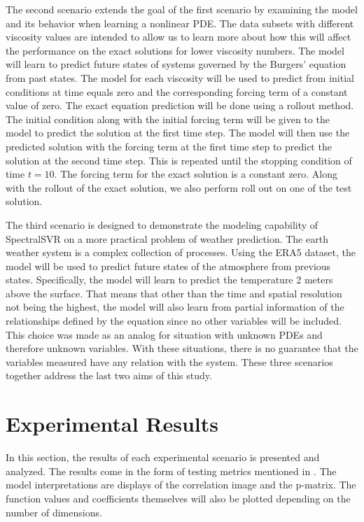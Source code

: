 The second scenario extends the goal of the first scenario by examining the model and its behavior when learning a nonlinear PDE\@. The data subsets with different viscosity values are intended to allow us to learn more about how this will affect the performance on the exact solutions for lower viscosity numbers. The model will learn to predict future states of systems governed by the Burgers' equation from past states. The model for each viscosity will be used to predict  from initial conditions at time equals zero and the corresponding forcing term of a constant value of zero. The exact equation prediction will be done using a rollout method. The initial condition along with the initial forcing term will be given to the model to predict the solution at the first time step. The model will then use the predicted solution with the forcing term at the first time step to predict the solution at the second time step. This is repeated until the stopping condition of time \(t=10\). The forcing term for the exact solution is a constant zero. Along with the rollout of the exact solution, we also perform roll out on one of the test solution.

The third scenario is designed to demonstrate the modeling capability of SpectralSVR on a more practical problem of weather prediction. The earth weather system is a complex collection of processes. Using the ERA5 dataset, the model will be used to predict future states of the atmosphere from previous states. Specifically, the model will learn to predict the temperature 2 meters above the surface. That means that other than the time and spatial resolution not being the highest, the model will also learn from partial information of the relationships defined by the equation since no other variables will be included. This choice was made as an analog for situation with unknown PDEs and therefore unknown variables. With these situations, there is no guarantee that the variables measured have any relation with the system. These three scenarios together address the last two aims of this study.

\section{Experimental Results}\label{sec:experimental_results}
\noindent In this section, the results of each experimental scenario is presented and analyzed. The results come in the form of testing metrics mentioned in . The model interpretations are displays of the correlation image and the p-matrix. The function values and coefficients themselves will also be plotted depending on the number of dimensions.

